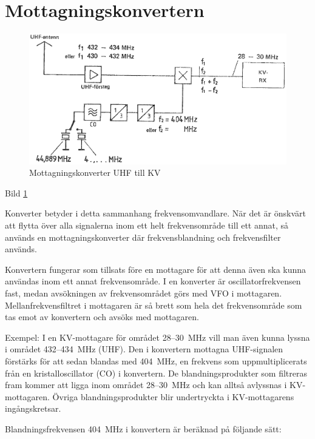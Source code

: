 \section{Mottagningskonvertern}

\begin{figure}
  \includegraphics[width=\textwidth]{images/bild_2_4-18.png}
  \caption{Mottagningskonverter UHF till KV}
  \label{fig:bildII4-18}
\end{figure}

Bild \ref{fig:bildII4-18}

Konverter betyder i detta sammanhang frekvensomvandlare. När det är
önskvärt att flytta över alla signalerna inom ett helt frekvensområde
till ett annat, så används en mottagningskonverter där
frekvensblandning och frekvensfilter används.

Konvertern fungerar som tillsats före en mottagare för att denna även
ska kunna användas inom ett annat frekvensområde. I en konverter är
oscillatorfrekvensen fast, medan avsökningen av frekvensområdet görs
med VFO i mottagaren. Mellanfrekvensfiltret i mottagaren är så brett
som hela det frekvensområde som tas emot av konvertern och avsöks med
mottagaren.

Exempel: I en KV-mottagare för området 28--30~MHz vill man även kunna
lyssna i området 432--434~MHz (UHF). Den i konvertern mottagna
UHF-signalen förstärks för att sedan blandas med 404~MHz, en frekvens
som uppmultiplicerats från en kristalloscillator (CO) i konvertern. De
blandningsprodukter som filtreras fram kommer att ligga inom området
28--30~MHz och kan alltså avlyssnas i KV-mottagaren. Övriga
blandningsprodukter blir undertryckta i KV-mottagarens ingångskretsar.

Blandningsfrekvensen 404~MHz i konvertern är beräknad på följande sätt:

